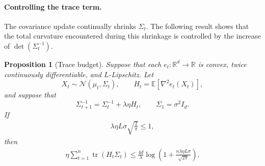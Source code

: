 \documentclass{article}
\theoremstyle{plain}
\newtheorem{proposition}[theorem]{Proposition}
\theoremstyle{definition}
\theoremstyle{plain}
\newcommand{\R}{\mathbb R}
\newcommand{\tr}{\operatorname{tr}}
\newcommand{\E}{\mathbb E}
\newcommand{\cN}{\mathcal N}
\begin{document}
\paragraph{Controlling the trace term.}
The covariance update continually shrinks $\Sigma_t$. The following
result shows that the total curvature encountered during this shrinkage
is controlled by the increase of $\det(\Sigma_t^{-1})$.

\begin{proposition}[Trace budget]
    \label{prop:hermite-ons:trace-budget}
    Suppose that each $e_t:\R^d\to\R$ is convex, twice continuously
    differentiable, and $L$-Lipschitz. Let
    \[
        X_t\sim\cN(\mu_t,\Sigma_t),
        \qquad
        H_t=\E[\nabla^2e_t(X_t)],
    \]
    and suppose that
    \[
        \Sigma_{t+1}^{-1}
        =
        \Sigma_t^{-1}+\lambda\eta H_t,
        \qquad
        \Sigma_1=\sigma^2I_d.
    \]
    If
    \begin{align}
        \lambda\eta L\sigma\sqrt{\frac{2}{\pi}}\leq1,
        \label{eq:hermite-ons:trace-step-size}
    \end{align}
    then
    \begin{align}
        \eta\sum_{t=1}^n\tr(H_t\Sigma_t)
        \leq
        \frac{4d}{\lambda}
        \log\left(
        1+\frac{n\lambda\eta L\sigma}{\sqrt{2\pi}}
        \right).
        \label{eq:hermite-ons:trace-budget}
    \end{align}
\end{proposition}
\end{document}
